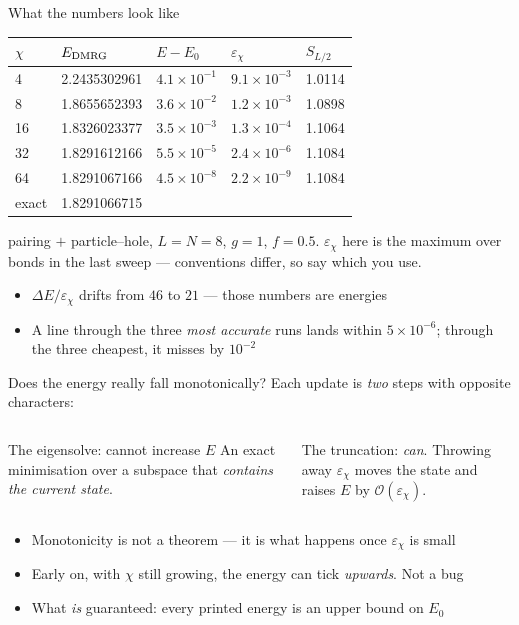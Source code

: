\documentclass[aspectratio=169,10pt]{beamer}
\newcommand{\warnbox}[1]{%
  \begin{tcolorbox}[colback=palewarm,colframe=warm,title={\bfseries A trap to avoid}]
  #1
  \end{tcolorbox}}
\newcommand{\bigO}{\mathcal{O}}
\begin{document}
\begin{frame}{What the numbers look like}
  \begin{center}\small
  \begin{tabular}{@{}lllll@{}}\toprule
  $\chi$ & $E_{\rm DMRG}$ & $E-E_0$ & $\varepsilon_\chi$ & $S_{L/2}$\\\midrule
  4 & 2.2435302961 & $4.1\times10^{-1}$ & $9.1\times10^{-3}$ & 1.0114\\
  8 & 1.8655652393 & $3.6\times10^{-2}$ & $1.2\times10^{-3}$ & 1.0898\\
  16 & 1.8326023377 & $3.5\times10^{-3}$ & $1.3\times10^{-4}$ & 1.1064\\
  32 & 1.8291612166 & $5.5\times10^{-5}$ & $2.4\times10^{-6}$ & 1.1084\\
  64 & 1.8291067166 & $4.5\times10^{-8}$ & $2.2\times10^{-9}$ & 1.1084\\
  exact & 1.8291066715 &&&\\\bottomrule
  \end{tabular}
  \end{center}
  \centering\small pairing $+$ particle--hole, $L=N=8$, $g=1$, $f=0.5$. \quad
  $\varepsilon_\chi$ here is the \alert{maximum over bonds} in the last sweep --- conventions differ, so say which you use.
  \begin{itemize}
    \item $\Delta E/\varepsilon_\chi$ drifts from $46$ to $21$ --- \alert{those numbers are energies}
    \item A line through the three \emph{most accurate} runs lands within $5\times10^{-6}$; through the three cheapest, it misses by $10^{-2}$
  \end{itemize}
\end{frame}

\begin{frame}{Does the energy really fall monotonically?}
  Each update is \emph{two} steps with opposite characters:
  \begin{columns}[T]
    \begin{block}{The eigensolve: cannot increase $E$}
      An exact minimisation over a subspace that \emph{contains the current state}.
    \end{block}
    \warnbox{The truncation: \emph{can}. Throwing away $\varepsilon_\chi$ moves the state and raises $E$ by $\bigO(\varepsilon_\chi)$.}
  \end{columns}
  \vspace{0.4em}
  \begin{itemize}
    \item Monotonicity is \alert{not a theorem} --- it is what happens once $\varepsilon_\chi$ is small
    \item Early on, with $\chi$ still growing, the energy can tick \emph{upwards}. Not a bug
    \item What \emph{is} guaranteed: every printed energy is an \alert{upper bound} on $E_0$
  \end{itemize}
\end{frame}
\end{document}
